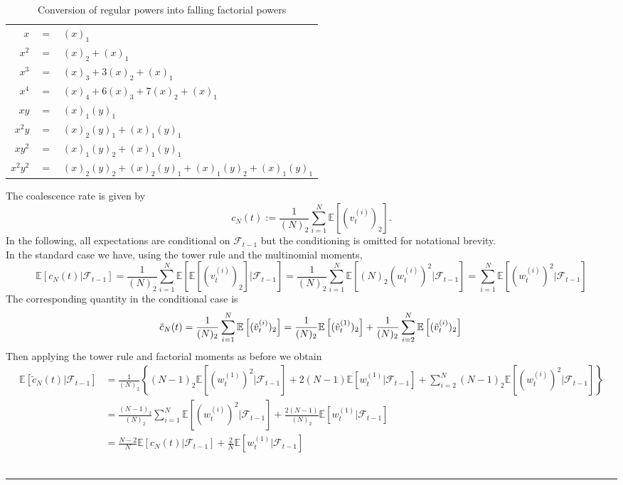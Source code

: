 \documentclass[fleqn]{article}
\newcommand{\E}{\mathbb{E}}
\newcommand{\vt}[2][t]{v_{#1}^{(#2)}}
\newcommand{\vttilde}[2][t]{\tilde{v}_{#1}^{(#2)}}
\newcommand{\wt}[2][t]{w_{#1}^{(#2)}}
\newcommand{\F}{\mathcal{F}_{t-1}}
\newcommand{\myrule}{\\ \rule{\textwidth}{1pt}}
\begin{document}
\begin{table}
\centering
\begin{tabular}{r c l}
\hline
$x$ & $=$ & $(x)_1$ \\
$x^2$ & $=$ & $(x)_2 + (x)_1$ \\
$x^3$ & $=$ & $(x)_3 + 3(x)_2 + (x)_1$ \\
$x^4$ & $=$ & $(x)_4 + 6(x)_3 + 7(x)_2 + (x)_1$ \\
\hline
$xy$ & $=$ & $(x)_1(y)_1$ \\
$x^2y$ & $=$ & $(x)_2(y)_1 + (x)_1(y)_1$ \\
$xy^2$ & $=$ & $(x)_1(y)_2 + (x)_1(y)_1$ \\
$x^2y^2$ & $=$ & $(x)_2(y)_2 + (x)_2(y)_1 + (x)_1(y)_2 +  (x)_1(y)_1$ \\
\hline
\end{tabular}
\caption{Conversion of regular powers into falling factorial powers}
\label{tab:fact_powers}
\end{table}

The coalescence rate is given by
\begin{equation*}
c_N(t) := \frac{1}{(N)_2} \sum_{i=1}^{N} \E\left[ (\vt{i})_2 \right].
\end{equation*}
In the following, all expectations are conditional on $\F$ but the conditioning is omitted for notational brevity.\\
In the standard case we have, using the tower rule and the multinomial moments,
\begin{equation*}
\E[c_N(t) |\F] 
= \frac{1}{(N)_2} \sum_{i=1}^{N} \E\left[ \E[ (\vt{i})_2 ] |\F \right]
=\frac{1}{(N)_2} \sum_{i=1}^{N} \E\left[(N)_2 (\wt{i})^2 |\F \right] 
= \sum_{i=1}^{N} \E\left[(\wt{i})^2 |\F \right]
\end{equation*}
The corresponding quantity in the conditional case is
\begin{equation*}
\tilde{c}_N(t) = \frac{1}{(N)_2} \sum_{i=1}^{N} \E\left[ (\vttilde{i})_2 \right] 
= \frac{1}{(N)_2} \E\left[ (\vttilde{1})_2 \right] + \frac{1}{(N)_2}\sum_{i=2}^{N} \E\left[ (\vttilde{i})_2 \right] \\
\end{equation*}
Then applying the tower rule and factorial moments as before we obtain
\begin{align*}
\E[\tilde{c}_N(t) |\F] &= \frac{1}{(N)_2} \left\{ (N-1)_2\E[(\wt{1})^2 |\F] + 2(N-1)\E[\wt{1} |\F] + \sum_{i=2}^{N} (N-1)_2\E[(\wt{i})^2 |\F] \right\}\\
&= \frac{(N-1)_2}{(N)_2} \sum_{i=1}^{N} \E[(\wt{i})^2 |\F] + \frac{2(N-1)}{(N)_2} \E[\wt{1} |\F] \\
&= \frac{N-2}{N} \E[c_N(t) |\F] + \frac{2}{N} \E[\wt{1} |\F]
\end{align*}
\myrule
\end{document}
